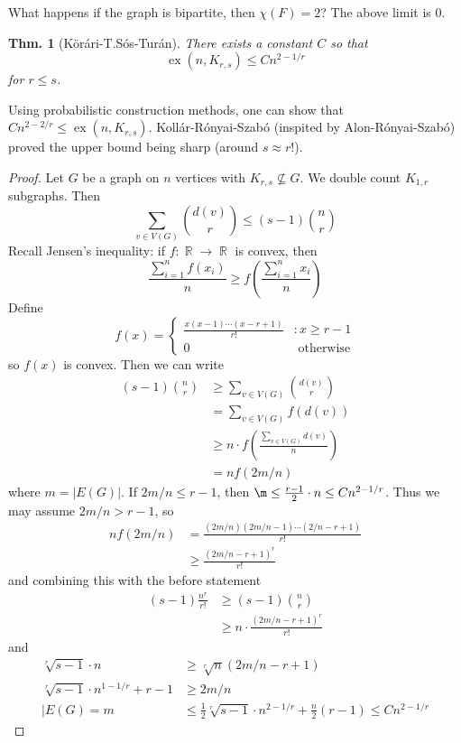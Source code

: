 \documentclass[12pt, a4paper]{book}
\DeclareMathOperator{\R}{\mathbb{R}}
\DeclareMathOperator{\ex}{ex}
\newtheorem{theorem}{Thm.}[section]
\theoremstyle{nonumberplain}
\newtheorem{proof}{Proof}
\begin{document}
What happens if the graph is bipartite, then $\chi(F)=2$?
The above limit is 0.
\begin{theorem}[K\"or\'ari-T.S\'os-Tur\'an]
    There exists a constant $C$ so that
    \[\ex(n,K_{r,s})\leq Cn^{2-1/r}\]
    for $r\leq s$.
\end{theorem}
Using probabilistic construction methods, one can show that $Cn^{2-2/r}\leq\ex(n,K_{r,s})$.
Koll\'ar-R\'onyai-Szab\'o (inspited by Alon-R\'onyai-Szab\'o) proved the upper bound being sharp (around $s\approx r!$).
\begin{proof}
    Let $G$ be a graph on $n$ vertices with $K_{r,s}\not\subseteq G$.
    We double count $K_{1,r}$ subgraphs.
    Then
    \[\sum\limits_{v\in V(G)}\binom{d(v)}{r}\leq(s-1)\binom{n}{r}\]
    Recall Jensen's inequality: if $f:\R\to\R$ is convex, then
    \[\frac{\sum\limits_{i=1}^nf(x_i)}{n}\geq f\left(\frac{\sum\limits_{i=1}^n x_i}{n}\right)\]
    Define
    \[f(x)=
        \begin{cases}
            \frac{x(x-1)\cdots(x-r+1)}{r!} &: x\geq r-1\\
            0 &\text{ otherwise}
        \end{cases}
    \]
    so $f(x)$ is convex.
    Then we can write
    \begin{align*}
        (s-1)\binom{n}{r} &\geq \sum\limits_{v\in V(G)}\binom{d(v)}{r}\\
                          &= \sum\limits_{v\in V(G)} f(d(v))\\
                          &\geq n\cdot f\left(\frac{\sum\limits_{v\in V(G)}d(v)}{n}\right)\\
                          &= nf(2m/n)
    \end{align*}
    where $m=|E(G)|$.
    If $2m/n\leq r-1$, then $\m\leq\frac{r-1}{2}\cdot n\leq Cn^{2-1/r}$.
    Thus we may assume $2m/n>r-1$, so
    \begin{align*}
        nf(2m/n) &= \frac{(2m/n)(2m/n-1)\cdots(2/n-r+1)}{r!}\\
                 &\geq\frac{(2m/n-r+1)^r}{r!}
    \end{align*}
    and combining this with the before statement
    \begin{align*}
        (s-1)\frac{n^r}{r!} &\geq (s-1)\binom{n}{r}\\
                            &\geq n\cdot\frac{(2m/n-r+1)^r}{r!}
    \end{align*}
    and
    \begin{align*}
        \sqrt[r]{s-1}\cdot n&\geq\sqrt[r]{n}(2m/n-r+1)\\
        \sqrt[r]{s-1}\cdot n^{1-1/r}+r-1&\geq 2m/n\\
        |E(G)=m &\leq \frac{1}{2}\sqrt[r]{s-1}\cdot n^{2-1/r}+\frac{n}{2}(r-1)\leq Cn^{2-1/r}
    \end{align*}
\end{proof}
\end{document}
